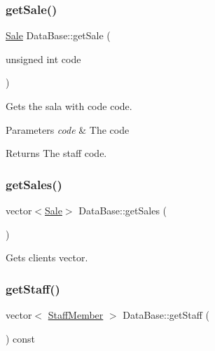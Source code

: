 \subsubsection{\texorpdfstring{get\+Sale()}{getSale()}}
{\footnotesize\ttfamily \hyperlink{classSale}{Sale} Data\+Base\+::get\+Sale (\begin{DoxyParamCaption}\item[{unsigned int}]{code }\end{DoxyParamCaption})}



Gets the sala with code code. 


\begin{DoxyParams}{Parameters}
{\em code} & The code\\
\hline
\end{DoxyParams}
\begin{DoxyReturn}{Returns}
The staff code. 
\end{DoxyReturn}
\mbox{\label{classDataBase_a0c0c3efb8ee0d6e1a4b2d97b8d35feeb}} 
\subsubsection{\texorpdfstring{get\+Sales()}{getSales()}}
{\footnotesize\ttfamily vector$<$\hyperlink{classSale}{Sale}$>$ Data\+Base\+::get\+Sales (\begin{DoxyParamCaption}{ }\end{DoxyParamCaption})\hspace{0.3cm}{\ttfamily [inline]}}



Gets clients vector. 

\mbox{\label{classDataBase_ad44eb614d0001979c6036e57af6b9e06}} 
\subsubsection{\texorpdfstring{get\+Staff()}{getStaff()}}
{\footnotesize\ttfamily vector$<$ \hyperlink{classStaffMember}{Staff\+Member} $>$ Data\+Base\+::get\+Staff (\begin{DoxyParamCaption}{ }\end{DoxyParamCaption}) const}



